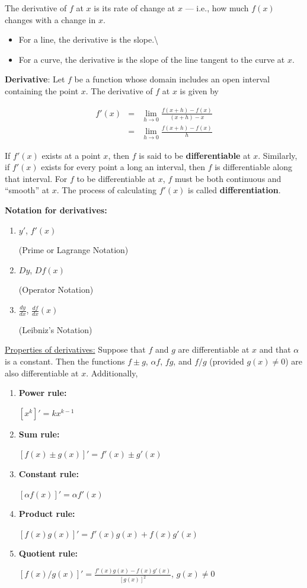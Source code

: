 \documentclass[]{book}
\providecommand{\tightlist}{%
  \setlength{\itemsep}{0pt}\setlength{\parskip}{0pt}}
\theoremstyle{definition}
\theoremstyle{definition}
\theoremstyle{definition}
\theoremstyle{remark}
\begin{document}
The derivative of \(f\) at \(x\) is its rate of change at \(x\) ---
i.e., how much \(f(x)\) changes with a change in \(x\).

\begin{itemize}
\tightlist
\item
  For a line, the derivative is the slope.\textbackslash{}
\item
  For a curve, the derivative is the slope of the line tangent to the
  curve at \(x\).
\end{itemize}

\textbf{Derivative}: Let \(f\) be a function whose domain includes an
open interval containing the point \(x\). The derivative of \(f\) at
\(x\) is given by

\begin{eqnarray}
        f'(x) &=&\lim\limits_{h\to 0} \frac{f(x+h)-f(x)}{(x+h)-x}\nonumber\\
        &=&\lim\limits_{h\to 0} \frac{f(x+h)-f(x)}{h}\nonumber
\end{eqnarray}

If \(f'(x)\) exists at a point \(x\), then \(f\) is said to be
\textbf{differentiable} at \(x\). Similarly, if \(f'(x)\) exists for
every point a long an interval, then \(f\) is differentiable along that
interval. For \(f\) to be differentiable at \(x\), \(f\) must be both
continuous and ``smooth'' at \(x\). The process of calculating \(f'(x)\)
is called \textbf{differentiation}.

\textbf{Notation for derivatives:}

\begin{enumerate}
        \item \parbox[t]{2in}{$y'$, $f'(x)$} (Prime or Lagrange Notation)
        \item \parbox[t]{2in}{$Dy$, $Df(x)$} (Operator Notation)
        \item \parbox[t]{2in}{$\frac{dy}{dx}$, $\frac{df}{dx}(x)$} (Leibniz's Notation)
\end{enumerate}

\underline{Properties of derivatives:} Suppose that \(f\) and \(g\) are
differentiable at \(x\) and that \(\alpha\) is a constant. Then the
functions \(f\pm g\), \(\alpha f\), \(f g\), and \(f/g\) (provided
\(g(x)\ne 0\)) are also differentiable at \(x\). Additionally,

\begin{enumerate}
        \item \parbox[t]{2in}{\bf Power rule:} $[x^k]' = k x^{k-1}$  
        \item \parbox[t]{2in}{\bf Sum rule:} $[f(x)\pm g(x)]' = f'(x)\pm g'(x)$ 
        \item \parbox[t]{2in}{\bf Constant rule:} $[\alpha f(x)]' = \alpha f'(x)$ 
        \item \parbox[t]{2in}{\bf Product rule:} $[f(x)g(x)]' = f'(x)g(x)+f(x)g'(x)$
        \item \parbox[t]{2in}{\bf Quotient rule:} $[f(x)/g(x)]' = \frac{f'(x)g(x)-f(x)g'(x)}{[g(x)]^2}$, $g(x)\ne 0$\\
\end{enumerate}
\end{document}
